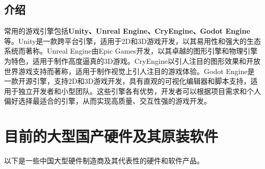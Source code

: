 \documentclass[11pt, a4paper, oneside]{ctexbook}
\begin{document}
\subsection{介绍}
常用的游戏引擎包括\textbf{Unity、Unreal Engine、CryEngine、Godot Engine}等。Unity是一款跨平台引擎，适用于2D和3D游戏开发，以其易用性和强大的生态系统而著称。Unreal Engine由Epic Games开发，以其卓越的图形引擎和物理引擎为特色，适用于制作高度逼真的3D游戏。CryEngine以引人注目的图形效果和开放世界游戏支持而著称，适用于制作视觉上引人注目的游戏体验。Godot Engine是一款开源引擎，支持2D和3D游戏开发，具有直观的可视化编辑器和脚本支持，适用于独立开发者和小型团队。这些引擎各有优势，开发者可以根据项目需求和个人偏好选择最适合的引擎，从而实现高质量、交互性强的游戏开发。
\section{目前的大型国产硬件及其原装软件}
以下是一些中国大型硬件制造商及其代表性的硬件和软件产品。
\end{document}
